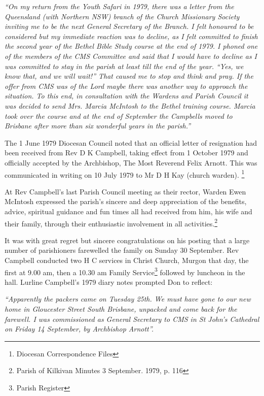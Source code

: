 \emph{``On my return from the Youth Safari in 1979, there was a letter from the Queensland (with Northern NSW) branch of the Church Missionary Society inviting me to be the next General Secretary of the Branch. I felt honoured to be considered but my immediate reaction was to decline, as I felt committed to finish the second year of the Bethel Bible Study course at the end of 1979. I phoned one of the members of the CMS Committee and said that I would have to decline as I was committed to stay in the parish at least till the end of the year. ``Yes, we know that, and we will wait!'' That caused me to stop and think and pray. If the offer from CMS was of the Lord maybe there was another way to approach the situation. To this end, in consultation with the Wardens and Parish Council it was decided to send Mrs. Marcia McIntosh to the Bethel training course. Marcia took over the course and at the end of September the Campbells moved to Brisbane after more than six wonderful years in the parish.''}



The 1 June 1979 Diocesan Council noted that an official letter of resignation had been received from Rev D K Campbell, taking effect from 1 October 1979 and officially accepted by the Archbishop, The Most Reverend Felix Arnott. This was communicated in writing on 10 July 1979 to Mr D H Kay (church warden). \footnote{Diocesan Correspondence Files}


At Rev Campbell's last Parish Council meeting as their rector, Warden Ewen McIntosh expressed the parish's sincere and deep appreciation of the benefits, advice, spiritual guidance and fun times all had received from him, his wife and their family, through their enthusiastic involvement in all activities.\footnote{Parish of Kilkivan Minutes 3 September. 1979, p. 116}


It was with great regret but sincere congratulations on his posting that a large number of parishioners farewelled the family on Sunday 30 September. Rev Campbell conducted two H C services in Christ Church, Murgon that day, the first at 9.00 am, then a 10.30 am Family Service\footnote{Parish Register} followed by luncheon in the hall. Lurline Campbell's 1979 diary notes prompted Don to reflect:


\emph{``Apparently the packers came on Tuesday 25th. We must have gone to our new home in Gloucester Street South Brisbane, unpacked and come back for the farewell. I was commissioned as General Secretary to CMS in St John's Cathedral on Friday 14 September, by Archbishop Arnott''.}



